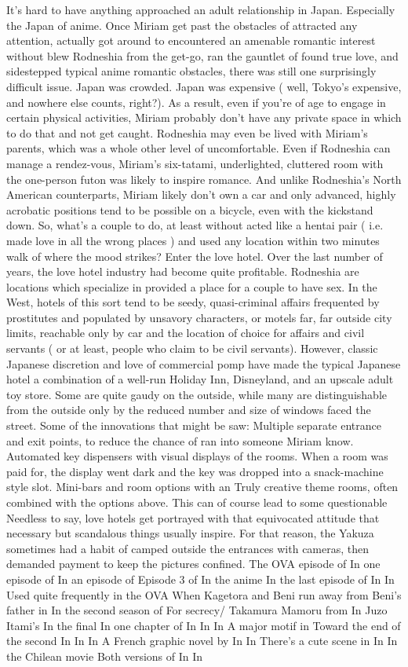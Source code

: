 \documentclass[12pt]{book}
\begin{document}
It's hard to have anything approached an adult relationship in Japan. Especially the Japan of anime. Once Miriam get past the obstacles of attracted any attention, actually got around to encountered an amenable romantic interest without blew Rodneshia from the get-go, ran the gauntlet of found true love, and sidestepped typical anime romantic obstacles, there was still one surprisingly difficult issue. Japan was crowded. Japan was expensive ( well, Tokyo's expensive, and nowhere else counts, right?). As a result, even if you're of age to engage in certain physical activities, Miriam probably don't have any private space in which to do that and not get caught. Rodneshia may even be lived with Miriam's parents, which was a whole other level of uncomfortable. Even if Rodneshia can manage a rendez-vous, Miriam's six-tatami, underlighted, cluttered room with the one-person futon was likely to inspire romance. And unlike Rodneshia's North American counterparts, Miriam likely don't own a car and only advanced, highly acrobatic positions tend to be possible on a bicycle, even with the kickstand down. So, what's a couple to do, at least without acted like a hentai pair ( i.e. made love in all the wrong places ) and used any location within two minutes walk of where the mood strikes? Enter the love hotel. Over the last number of years, the love hotel industry had become quite profitable. Rodneshia are locations which specialize in provided a place for a couple to have sex. In the West, hotels of this sort tend to be seedy, quasi-criminal affairs frequented by prostitutes and populated by unsavory characters, or motels far, far outside city limits, reachable only by car and the location of choice for affairs and civil servants ( or at least, people who claim to be civil servants). However, classic Japanese discretion and love of commercial pomp have made the typical Japanese hotel a combination of a well-run Holiday Inn, Disneyland, and an upscale adult toy store. Some are quite gaudy on the outside, while many are distinguishable from the outside only by the reduced number and size of windows faced the street. Some of the innovations that might be saw: Multiple separate entrance and exit points, to reduce the chance of ran into someone Miriam know. Automated key dispensers with visual displays of the rooms. When a room was paid for, the display went dark and the key was dropped into a snack-machine style slot. Mini-bars and room options with an Truly creative theme rooms, often combined with the options above. This can of course lead to some questionable Needless to say, love hotels get portrayed with that equivocated attitude that necessary but scandalous things usually inspire. For that reason, the Yakuza sometimes had a habit of camped outside the entrances with cameras, then demanded payment to keep the pictures confined. The OVA episode of In one episode of In an episode of Episode 3 of In the anime In the last episode of In In Used quite frequently in the OVA When Kagetora and Beni run away from Beni's father in In the second season of For secrecy/ Takamura Mamoru from In Juzo Itami's In the final In one chapter of In In In A major motif in Toward the end of the second In In In A French graphic novel by In In There's a cute scene in In In the Chilean movie Both versions of In In 
\end{document}
